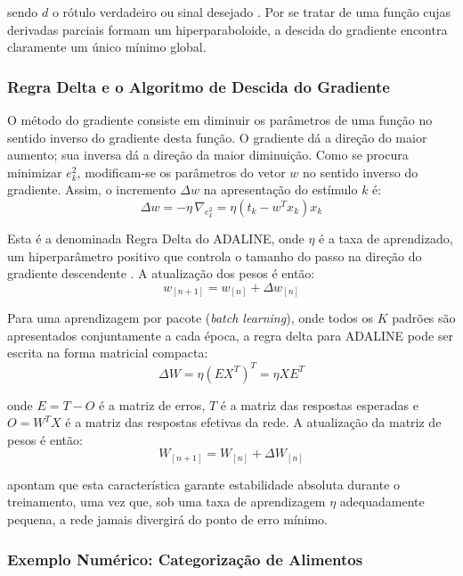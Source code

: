 sendo $d$ o rótulo verdadeiro ou sinal desejado \cite{abdi2006}. Por se tratar de uma função cujas derivadas parciais formam um hiperparaboloide, a descida do gradiente encontra claramente um único mínimo global.

\subsubsection{Regra Delta e o Algoritmo de Descida do Gradiente}

O método do gradiente consiste em diminuir os parâmetros de uma função no sentido inverso do gradiente desta função. O gradiente dá a direção do maior aumento; sua inversa dá a direção da maior diminuição. Como se procura minimizar $e_k^2$, modificam-se os parâmetros do vetor $w$ no sentido inverso do gradiente. Assim, o incremento $\Delta w$ na apresentação do estímulo $k$ é:
\begin{equation}
\Delta w = -\eta \, \nabla_{e_k^2} = \eta(t_k - w^T x_k) x_k
\end{equation}

Esta é a denominada Regra Delta do ADALINE, onde $\eta$ é a taxa de aprendizado, um hiperparâmetro positivo que controla o tamanho do passo na direção do gradiente descendente \cite{braga2007}. A atualização dos pesos é então:
\begin{equation}
w_{[n+1]} = w_{[n]} + \Delta w_{[n]}
\end{equation}

Para uma aprendizagem por pacote (\textit{batch learning}), onde todos os $K$ padrões são apresentados conjuntamente a cada época, a regra delta para ADALINE pode ser escrita na forma matricial compacta:
\begin{equation}
\Delta W = \eta (E X^T)^T = \eta X E^T
\end{equation}

onde $E = T - O$ é a matriz de erros, $T$ é a matriz das respostas esperadas e $O = W^T X$ é a matriz das respostas efetivas da rede. A atualização da matriz de pesos é então:
\begin{equation}
W_{[n+1]} = W_{[n]} + \Delta W_{[n]}
\end{equation}

 apontam que esta característica garante estabilidade absoluta durante o treinamento, uma vez que, sob uma taxa de aprendizagem $\eta$ adequadamente pequena, a rede jamais divergirá do ponto de erro mínimo.

\subsubsection{Exemplo Numérico: Categorização de Alimentos}

